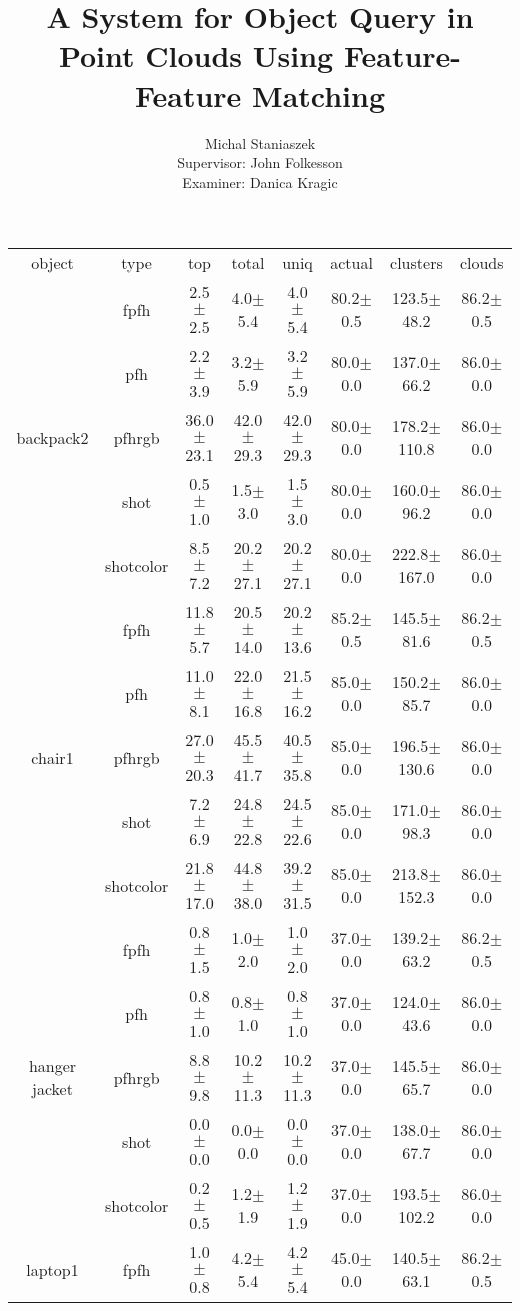 \message{ !name(report.tex)}\documentclass[11pt,a4paper]{kth-mag}
\author{Michal Staniaszek \\  \vskip 3cm Supervisor: John Folkesson \\ Examiner: Danica Kragic}
\title{A System for Object Query in Point Clouds Using Feature-Feature Matching}
\begin{document}
\begin{table}
\begin{tabular}{cc|cccccc}
object & type & top & total & uniq & actual & clusters & clouds \\
\multirow{5}{*}{backpack2} & fpfh & 2.5$\pm$2.5 & 4.0$\pm$5.4 & 4.0$\pm$5.4 & 80.2$\pm$0.5 & 123.5$\pm$48.2 & 86.2$\pm$0.5\\
 & pfh & 2.2$\pm$3.9 & 3.2$\pm$5.9 & 3.2$\pm$5.9 & 80.0$\pm$0.0 & 137.0$\pm$66.2 & 86.0$\pm$0.0\\
 & pfhrgb & 36.0$\pm$23.1 & 42.0$\pm$29.3 & 42.0$\pm$29.3 & 80.0$\pm$0.0 & 178.2$\pm$110.8 & 86.0$\pm$0.0\\
 & shot & 0.5$\pm$1.0 & 1.5$\pm$3.0 & 1.5$\pm$3.0 & 80.0$\pm$0.0 & 160.0$\pm$96.2 & 86.0$\pm$0.0\\
 & shotcolor & 8.5$\pm$7.2 & 20.2$\pm$27.1 & 20.2$\pm$27.1 & 80.0$\pm$0.0 & 222.8$\pm$167.0 & 86.0$\pm$0.0\\\hline
\multirow{5}{*}{chair1} & fpfh & 11.8$\pm$5.7 & 20.5$\pm$14.0 & 20.2$\pm$13.6 & 85.2$\pm$0.5 & 145.5$\pm$81.6 & 86.2$\pm$0.5\\
 & pfh & 11.0$\pm$8.1 & 22.0$\pm$16.8 & 21.5$\pm$16.2 & 85.0$\pm$0.0 & 150.2$\pm$85.7 & 86.0$\pm$0.0\\
 & pfhrgb & 27.0$\pm$20.3 & 45.5$\pm$41.7 & 40.5$\pm$35.8 & 85.0$\pm$0.0 & 196.5$\pm$130.6 & 86.0$\pm$0.0\\
 & shot & 7.2$\pm$6.9 & 24.8$\pm$22.8 & 24.5$\pm$22.6 & 85.0$\pm$0.0 & 171.0$\pm$98.3 & 86.0$\pm$0.0\\
 & shotcolor & 21.8$\pm$17.0 & 44.8$\pm$38.0 & 39.2$\pm$31.5 & 85.0$\pm$0.0 & 213.8$\pm$152.3 & 86.0$\pm$0.0\\\hline
\multirow{5}{*}{hanger jacket} & fpfh & 0.8$\pm$1.5 & 1.0$\pm$2.0 & 1.0$\pm$2.0 & 37.0$\pm$0.0 & 139.2$\pm$63.2 & 86.2$\pm$0.5\\
 & pfh & 0.8$\pm$1.0 & 0.8$\pm$1.0 & 0.8$\pm$1.0 & 37.0$\pm$0.0 & 124.0$\pm$43.6 & 86.0$\pm$0.0\\
 & pfhrgb & 8.8$\pm$9.8 & 10.2$\pm$11.3 & 10.2$\pm$11.3 & 37.0$\pm$0.0 & 145.5$\pm$65.7 & 86.0$\pm$0.0\\
 & shot & 0.0$\pm$0.0 & 0.0$\pm$0.0 & 0.0$\pm$0.0 & 37.0$\pm$0.0 & 138.0$\pm$67.7 & 86.0$\pm$0.0\\
 & shotcolor & 0.2$\pm$0.5 & 1.2$\pm$1.9 & 1.2$\pm$1.9 & 37.0$\pm$0.0 & 193.5$\pm$102.2 & 86.0$\pm$0.0\\\hline
\multirow{5}{*}{laptop1} & fpfh & 1.0$\pm$0.8 & 4.2$\pm$5.4 & 4.2$\pm$5.4 & 45.0$\pm$0.0 & 140.5$\pm$63.1 & 86.2$\pm$0.5\\

\end{tabular}
\end{table}
\end{document}
